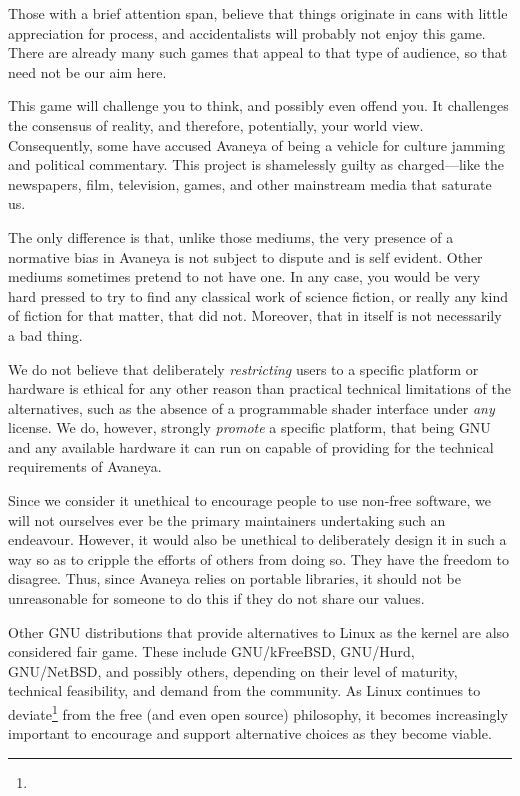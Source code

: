 Those with a brief attention span, believe that things originate in cans with little appreciation for process, and accidentalists will probably not enjoy this game. There are already many such games that appeal to that type of audience, so that need not be our aim here.

This game will challenge you to think, and possibly even offend you. It challenges the consensus of reality, and therefore, potentially, your world view. Consequently, some have accused Avaneya of being a vehicle for culture jamming and political commentary. This project is shamelessly guilty as charged---like the newspapers, film, television, games, and other mainstream media that saturate us. 

The only difference is that, unlike those mediums, the very presence of a normative bias in Avaneya is not subject to dispute and is self evident. Other mediums sometimes pretend to not have one. In any case, you would be very hard pressed to try to find any classical work of science fiction, or really any kind of fiction for that matter, that did not. Moreover, that in itself is not necessarily a bad thing.

We do not believe that deliberately {\it restricting} users to a specific platform or hardware is ethical for any other reason than practical technical limitations of the alternatives, such as the absence of a programmable shader interface under {\it any} license. We do, however, strongly {\it promote} a specific platform, that being GNU and any available hardware it can run on capable of providing for the technical requirements of Avaneya.

Since we consider it unethical to encourage people to use non-free software, we will not ourselves ever be the primary maintainers undertaking such an endeavour. However, it would also be unethical to deliberately design it in such a way so as to cripple the efforts of others from doing so. They have the freedom to disagree. Thus, since Avaneya relies on portable libraries, it should not be unreasonable for someone to do this if they do not share our values.

Other GNU distributions that provide alternatives to Linux as the kernel are also considered fair game. These include GNU/kFreeBSD, GNU/Hurd, GNU/NetBSD, and possibly others, depending on their level of maturity, technical feasibility, and demand from the community. As Linux continues to deviate\footnote{} from the free (and even open source) philosophy, it becomes increasingly important to encourage and support alternative choices as they become viable.

